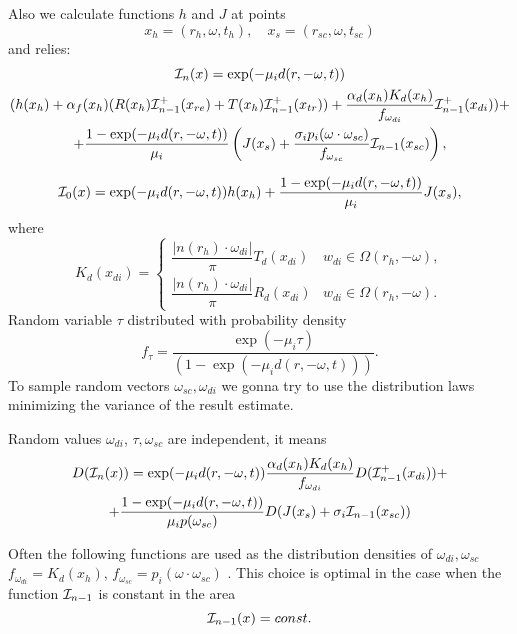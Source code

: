 \documentclass[12pt,reqno]{report}
\begin{document}
Also we calculate functions $h$ and $J$ at points
$$
x_h=(r_h,\omega,t_h),\quad
x_s=(r_{sc},\omega,t_{sc})
$$
and relies:
\begin{multline}
{\cal I}_n(x) = \exp(-\mu_i d(r, -\omega, t)) 
\\ (h(x_h) +  \alpha_f (x_h)(R(x_h) {\cal I}_{n-1}^+
(x_{re}) + T(x_h) {\cal I}_{n-1}^+ (x_{tr})) + \frac{\alpha_d(x_h) K_d(x_h)} {f_{\omega_{di}}} {\cal I}_{n-1}^+ (x_{di})) +
\\ + \frac{1 - \exp(-\mu_i d(r, -\omega, t))}{\mu_i} \left(J(x_s) + \frac{\sigma_i p_i(\omega \cdot \omega_{sc})} { f_{\omega_{sc}}} {\cal I}_{n-1}(x_{sc})\right),
\end{multline}


\begin{equation}
{\cal I}_0(x) = \exp(-\mu_i d(r, -\omega, t)) h(x_h) +
\frac{1 - \exp(-\mu_i d(r, -\omega, t))}{\mu_i} J(x_s),
\end{equation}
where
$$
K_d(x_{di}) = \left \{ 
\begin{array}{ll} 
	\dfrac{|n(r_h)\cdot \omega_{di}|}{\pi} T_d(x_{di}) & w_{di} \in \Omega(r_h,-\omega), \\
	\dfrac{|n(r_h)\cdot \omega_{di}|}{\pi} R_d(x_{di}) & w_{di} \in \Omega(r_h,-\omega).
\end{array} \right.
$$
Random variable $\tau$ distributed with probability density
$$
f_\tau = \displaystyle{\frac{\exp(-\mu_i \tau)}{(1-\exp(-\mu_i d(r,
-\omega, t)))}}.
$$
To sample random vectors $\omega_{sc}, \omega_{di} $ we gonna try to use the distribution laws 
minimizing the variance of the result estimate.

Random values $\omega_{di}$, $\tau, \omega_{sc}$ are independent, it means
\begin{multline}
D({\cal I}_n(x)) = \exp(-\mu_i d(r, -\omega, t)) \frac{\alpha_d(x_h) K_d(x_h)} {f_{\omega_{di}}} D({\cal I}_{n-1}^+ (x_{di})) + \\
 + \frac{1 - \exp(-\mu_i d(r, -\omega, t))}{\mu_i p(\omega_{sc})} D(J(x_{s}) + \sigma_i {\cal I}_{n-1}(x_{sc}))
\end{multline}

Often the following functions are used as the distribution densities of $\omega_{di}, \omega_{sc}$
${\displaystyle f_{\omega_{di}} = K_d(x_h)}$, 
${\displaystyle f_{\omega_{sc}} = p_i(\omega \cdot \omega_{sc}) }$ \cite{33}.
This choice is optimal in the case when the function ${\cal I}_{n-1}$ is constant in the area
\begin{equation}
{\cal I}_{n-1}(x) = const.
\end{equation}
\end{document}
